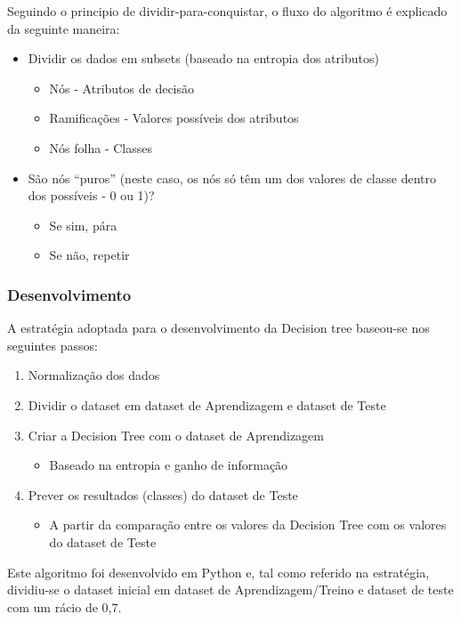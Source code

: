 \documentclass[portugues,final]{revdetua}
\begin{document}
Seguindo o principio de dividir-para-conquistar, o fluxo do algoritmo é explicado da seguinte maneira:
\begin{itemize}
\item Dividir os dados em subsets (baseado na entropia dos atributos)
\begin{itemize}
\item Nós - Atributos de decisão
\item Ramificações - Valores possíveis dos atributos
\item Nós folha - Classes
\end{itemize}
\item São nós “puros” (neste caso, os nós só têm um dos valores de classe dentro dos possíveis - 0 ou 1)?
\begin{itemize}
\item Se sim, pára
\item Se não, repetir
\end{itemize}
\end{itemize}

\subsubsection{Desenvolvimento}
A estratégia adoptada para o desenvolvimento da Decision tree baseou-se nos seguintes passos:
\begin{enumerate}
\item Normalização dos dados
\item Dividir o dataset em dataset de Aprendizagem e dataset de Teste
\item Criar a Decision Tree com o dataset de Aprendizagem
\begin{itemize}
\item Baseado na entropia e ganho de informação
\end{itemize}
\item Prever os resultados (classes) do dataset de Teste
\begin{itemize}
\item A partir da comparação entre os valores da Decision Tree com os valores do dataset de Teste
\end{itemize}
\end{enumerate}

Este algoritmo foi desenvolvido em Python e, tal como referido na estratégia, dividiu-se o dataset inicial em dataset de Aprendizagem/Treino e dataset de teste com um rácio de 0,7.\\
\end{document}
